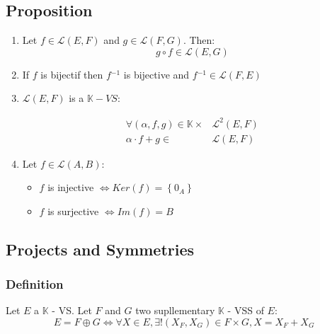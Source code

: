 \documentclass[notitlepage]{math}
\begin{document}
\subsection{Proposition}
\begin{enumerate}
    

    \item Let $f \in \mathcal{L}(E,F)$ and $g \in \mathcal{L}(F,G)$. Then: \[g \circ f \in \mathcal{L}(E,G)\]
    \item If $f$ is bijectif then $f{^{-1}}$ is bijective and $f{^{-1}} \in \mathcal{L}(F,E)$
    \item $\mathcal{L}(E,F)$ is a $\mathbb{K}-VS$:
        \newline
        \begin{minipage}{0.40\linewidth}
            
        \end{minipage}
        \hfill
        \begin{minipage}{0.59\linewidth}
            \begin{align*}
                \forall (\alpha, f, g) \in \mathbb{K} \times &\mathcal{L}^2(E,F) \\
                \alpha \cdot f + g \in &\mathcal{L}(E,F)
            \end{align*}
        \end{minipage}
    \item Let $f \in \mathcal{L}(A,B)$:
        \begin{itemize}
            \item $f$ is injective $ \Longleftrightarrow  Ker(f) = \left\{ 0_A \right\}$
            \item $f$ is surjective $ \Longleftrightarrow  Im(f) = B$
        \end{itemize}
\end{enumerate}
\subsection{Projects and Symmetries}
\subsubsection{Definition}
Let $E$ a $\mathbb{K}$ - VS. Let $F$ and $G$ two supllementary $\mathbb{K}$ - VSS of $E$:
\[E = F \oplus G  \Longleftrightarrow \forall X \in E, \exists ! (X_F, X_G) \in F \times G, X = X_F + X_G\]
\end{document}
